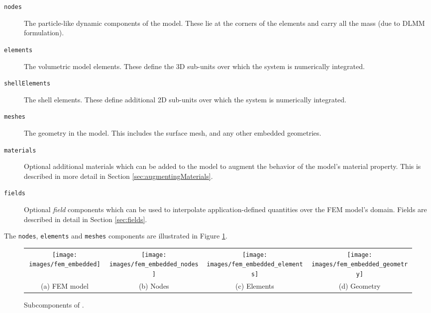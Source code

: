 \begin{description}
\item[{\tt nodes}]\mbox{}

The particle-like dynamic components of the model.  These lie at the corners
of the elements and carry all the mass (due to DLMM formulation).

\item[{\tt elements}]\mbox{}

The volumetric model elements. These define the 3D 
sub-units over which the system is numerically integrated.

\item[{\tt shellElements}]\mbox{}

The shell elements. These define additional 2D sub-units
over which the system is numerically integrated.

\item[{\tt meshes}]\mbox{}

The geometry in the model.  This includes the surface mesh, and any other
embedded geometries.

\item[{\tt materials}]\mbox{}

Optional additional materials which can be added to the
model to augment the behavior of the 
model's {\sf material} property. This is described in more detail
in Section \ref{sec:augmentingMaterials}.

\item[{\tt fields}]\mbox{}

Optional {\it field} components which can be used to interpolate
application-defined quantities over the FEM model's domain. Fields are
described in detail in Section \ref{sec:fields}.

\end{description}

The {\tt nodes}, {\tt elements} and {\tt meshes} components are
illustrated in Figure \ref{fig:fem}.

\begin{figure}[ht]
\centering
{}
\begin{tabular}{cccc}
\texttt{[image: images/fem\_embedded]} & 
\texttt{[image: images/fem\_embedded\_nodes]} &
\texttt{[image: images/fem\_embedded\_elements]} &
\texttt{[image: images/fem\_embedded\_geometry]}\\
(a) FEM model & (b) Nodes & (c) Elements & (d) Geometry
\end{tabular}
\caption{
Subcomponents of . 
\label{fig:fem}}
\end{figure}

